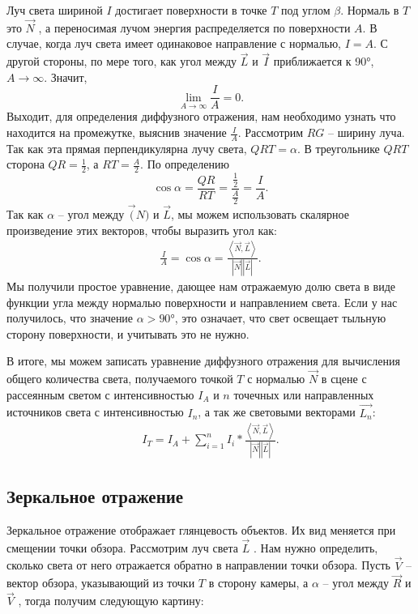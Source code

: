 Луч света шириной $I$ достигает поверхности в точке $T$ под углом $\beta$. Нормаль в $T$ это $\vec{N}$ , а переносимая лучом энергия распределяется по поверхности $A$. В случае, когда луч света имеет одинаковое направление с нормалью, $I=A$. С другой стороны, по мере того, как угол между $\vec{L}$ и $\vec{I}$ приближается к 90°, $A\to\infty$. Значит,
\begin{equation}
\lim_{A\to\infty} \frac{I}{A} = 0.
\end{equation}
Выходит, для определения диффузного отражения, нам необходимо узнать что находится на промежутке, выяснив значение $\frac{I}{A}$. Рассмотрим $RG$ – ширину луча. Так как эта прямая перпендикулярна лучу
света, $QRT = \alpha$. В треугольнике $QRT$ сторона $QR=\frac{1}{2}$, а $RT=\frac{A}{2}$. По определению
\begin{equation}
\cos{\alpha}=\frac{QR}{RT}=\frac{\frac{1}{2}}{\frac{A}{2}}=\frac{I}{A}.
\end{equation}
Так как $\alpha$ – угол между $\vec(N)$ и $\vec{L}$, мы можем использовать скалярное произведение этих векторов, чтобы выразить угол как:
\begin{gather}
	\frac{I}{A}=\cos{\alpha}=\frac{\left\langle{\vec{N}, \vec{L}}\right\rangle}{\left| {\vec{N}} \right| \left| {\vec{L}} \right|}.
\end{gather}
Мы получили простое уравнение, дающее нам отражаемую долю света в виде функции угла между нормалью поверхности и направлением света. Если у нас получилось, что значение $\alpha > 90°$, это означает, что свет освещает тыльную сторону поверхности, и учитывать это не нужно.

В итоге, мы можем записать уравнение диффузного отражения для вычисления общего количества света, получаемого точкой $T$ с нормалью $\vec{N}$ в сцене с рассеянным светом с интенсивностью $I_{A}$ и $n$ точечных или направленных источников света с интенсивностью $I_{n}$, а так же световыми векторами $\vec{L_{n}}$:
\begin{gather}
	I_{T} =  I_{A} + \sum_{i=1}^n I_{i}*\frac{\left\langle{\vec{N}, \vec{L}}\right\rangle}{\left| {\vec{N}} \right| \left| {\vec{L}} \right|}.
\end{gather}

\subsection{Зеркальное отражение}

Зеркальное отражение отображает глянцевость объектов. Их вид меняется при смещении точки обзора. Рассмотрим луч света $\vec{L}$ . Нам нужно определить, сколько света от него отражается обратно в направлении точки обзора. Пусть $\vec{V}$ – вектор обзора, указывающий из точки $T$ в сторону камеры, а $\alpha$ – угол между $\vec{R}$ и $\vec{V}$ , тогда получим следующую картину:

